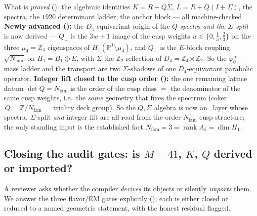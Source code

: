 \documentclass[11pt,a4paper]{article}
\newcommand{\Nfam}{N_{\mathrm{fam}}}
\newcommand{\phiz}{\varphi_0^{\mathrm{ret}}}
\newcommand{\PP}{\mathbb{P}}
\newcommand{\Z}{\mathbb{Z}}
\theoremstyle{definition}
\begin{document}
\begin{gapbox}
What is \emph{proved} (\mE): the algebraic identities $K=R+Q\Sigma$, $L=R+Q(I+\Sigma)$, the spectra, the
$1920$ determinant ladder, the anchor block --- all machine-checked. \textbf{Newly advanced ():}
the $D_4$-equivariant origin of the \emph{$Q$-spectra and the $\Sigma$-split} is now derived --- $Q_+$ is the
$3w{+}1$ image of the cusp weights $w\in\{0,\tfrac13,\tfrac23\}$ on the three $\mu_4{=}\Z_4$ eigenspaces of
$H_1(\PP^1\!\setminus\!\mu_4)$, and $Q_-$ is the $E$-block coupling $\sqrt{\Nfam}$ on $H_1=B_1\oplus E$, with
$\Sigma$ the $\Z_2$ reflection of $D_4=\Z_4\rtimes\Z_2$. So the $\phiz$-mass ladder and the transport are two
$\Sigma$-shadows of one $D_4$-equivariant parabolic operator. \textbf{Integer lift closed to the cusp order
():} the one remaining lattice datum $\det Q=\Nfam$ is the order of the cusp
class $=$ the denominator of the same cusp weights, i.e.\ the \emph{same} geometry that fixes the spectrum
(coker$\,Q=\Z/\Nfam=$ triality deck group). So the $Q,\Sigma$ algebra is now an \mE\ layer whose spectra,
$\Sigma$-split \emph{and} integer lift are all read from the order-$\Nfam$ cusp structure; the only standing
input is the established fact $\Nfam=3=\operatorname{rank}A_3=\dim H_1$.
\end{gapbox}

\subsection{Closing the audit gates: is $M{=}41$, $K$, $Q$ derived or imported?}
A reviewer asks whether the compiler \emph{derives} its objects or silently
\emph{imports} them. We answer the three flavor/EM gates explicitly
(); each is either closed or reduced to a named
geometric statement, with the honest residual flagged.
\end{document}
